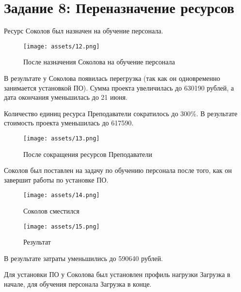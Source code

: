 \section{Задание 8: Переназначение ресурсов}

Ресурс Соколов был назначен на обучение персонала.

\begin{figure}[H]
    \begin{center}
    \texttt{[image: assets/12.png]}
    \caption{После назначения Соколова на обучение персонала}
    \label{fig:12}
    \end{center}
\end{figure}

В результате у Соколова появилась перегрузка (так как он одновременно занимается установкой ПО). Сумма проекта увеличилась до 630190 рублей, а дата окончания уменьшилась до 21 июня.

Количество единиц ресурса Преподаватели сократилось до 300\%. В результате стоимость проекта уменьшилась до 617590.

\begin{figure}[H]
    \begin{center}
    \texttt{[image: assets/13.png]}
    \caption{После сокращения ресурсов Преподаватели}
    \label{fig:13}
    \end{center}
\end{figure}

Соколов был поставлен на задачу по обучению персонала после того, как он завершит работы по установке ПО.

\begin{figure}[H]
    \begin{center}
    \texttt{[image: assets/14.png]}
    \caption{Соколов сместился}
    \label{fig:14}
    \end{center}
\end{figure}

\begin{figure}[H]
    \begin{center}
    \texttt{[image: assets/15.png]}
    \caption{Результат}
    \label{fig:15}
    \end{center}
\end{figure}

В результате затраты уменьшились до 590640 рублей.

Для установки ПО у Соколова был установлен профиль нагрузки Загрузка в начале, для обучения персонала Загрузка в конце.

